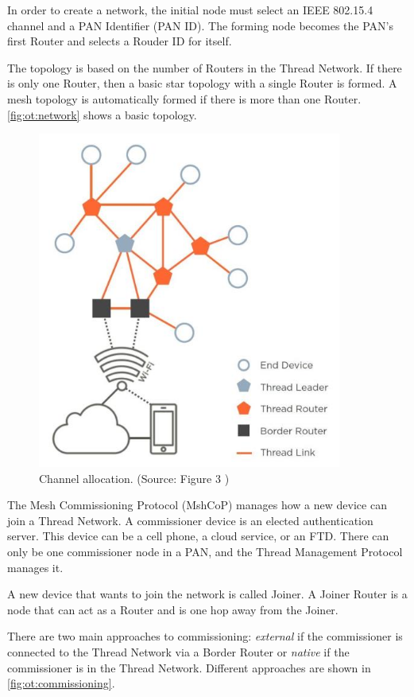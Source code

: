 In order to create a network, the initial node must select an IEEE 802.15.4 channel and
a PAN Identifier (PAN ID).
The forming node becomes the PAN's first Router and selects a Rouder ID for itself.

The topology is based on the number of Routers in the Thread Network.
If there is only one Router, then a basic star topology with a single Router is formed.
A mesh topology is automatically formed if there is more than one Router.
\autoref{fig:ot:network} shows a basic topology.

\begin{figure}[!ht]
    \centering
    \includegraphics[width=100mm, keepaspectratio]{figures/thread-topology-ThreadNetworkFundamentals_633_4.jpg}
    \caption{Channel allocation. (Source: Figure 3 \cite{thread:nfwp})}
    \label{fig:ot:network}
\end{figure}

The Mesh Commissioning Protocol (MshCoP) manages how a new device can join a Thread Network.
A commissioner device is an elected authentication server.
This device can be a cell phone, a cloud service, or an FTD.
There can only be one commissioner node in a PAN, and the Thread Management Protocol manages it.

A new device that wants to join the network is called Joiner.
A Joiner Router is a node that can act as a Router and is one hop away from the Joiner.

There are two main approaches to commissioning:
\emph{external} if the commissioner is connected to the Thread Network via a Border Router or
\emph{native} if the commissioner is in the Thread Network.
Different approaches are shown in \autoref{fig:ot:commissioning}.

